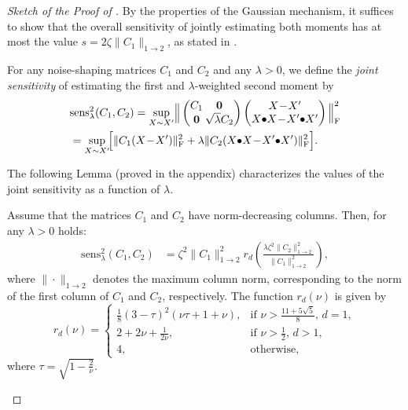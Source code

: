 \begin{proof}[Sketch of the Proof of ]
By the properties of the Gaussian mechanism, it suffices to show 
that the overall sensitivity of jointly estimating both moments 
has at most the value $s=2\zeta\|C_1\|_{1\to 2}$, as stated in . 
%
\begin{definition}
For any noise-shaping matrices $C_1$ and $C_2$ and any $\lambda>0$, we define
the \emph{joint sensitivity} of estimating the first and $\lambda$-weighted 
second moment by
\begin{align}
    &\text{sens}_{\lambda}^2(C_1,C_2)
    = \sup_{X \sim X'}\!\Big\|
    \begingroup\setlength{\arraycolsep}{1pt}\begin{pmatrix}
        C_1 & \textbf{0}\\
        \textbf{0} & \sqrt{\lambda} C_2\\
    \end{pmatrix}\endgroup
    \begingroup\setlength{\arraycolsep}{1pt}\begin{pmatrix}
        X \!-\! X'\\
        X \face X \!-\! X' \face X'
    \end{pmatrix}\endgroup \Big\|_{\Fr}^2 
    \\
    &=\sup_{X \sim X'}\!\!\Big[\|C_1(X \!-\! X')\|_{\Fr}^2 +  \lambda \|C_2
    (X \face X \!-\! X' \face X')\|_{\Fr}^2\Big].\notag
\end{align}
\end{definition}

The following Lemma (proved in the appendix) characterizes the values of the joint sensitivity as a function of $\lambda$. 
\begin{lemma}\label{lem:jointsensitivity}
Assume that the matrices $C_1$ and $C_2$ have norm-decreasing columns. Then, for any $\lambda > 0$ holds:  
\begin{align}
     \text{sens}_{\lambda}^2(C_1, C_2) &= \zeta^2 \|C_1\|_{1 \to 2}^2 r_d\left(\frac{\lambda \zeta^2 \|C_2\|_{1 \to 2}^2}{\|C_1\|_{1 \to 2}^2}\right),
\end{align}
where $\|\cdot\|_{1 \to 2}$ denotes the maximum column norm, corresponding to the norm of the first column of $C_1$ and $C_2$, respectively. The function $r_d(\nu)$ is given by 
\begin{equation}
        \label{eq:r_d}
        r_d(\nu) = 
        \begin{cases}
            \frac{1}{8} (3 - \tau)^2 (\nu \tau + 1 + \nu),  & \text{if } \nu > \frac{11 + 5\sqrt{5}}{8}, \, d = 1, \\[0.5em]
             2 + 2\nu + \frac{1}{2\nu}, & \text{if } \nu > \frac{1}{2}, \, d > 1, \\[0.5em]
             4,  & \text{otherwise,} %
        \end{cases}
\end{equation}
where $\tau = \sqrt{1 - \frac{2}{\nu}}$.
\end{lemma}


\end{proof}
